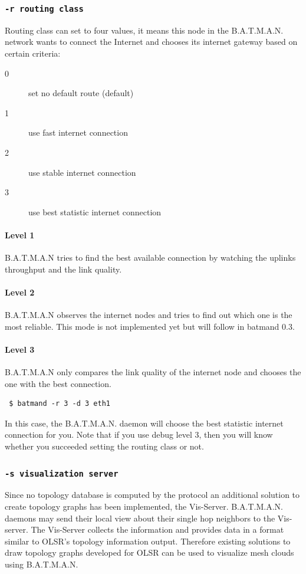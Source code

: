 \documentclass[
	12pt,
	a4paper,
	twoside,
	english,
	headsepline,
	footnosepline,
	automark,
	normalheadings,
	openany,
	cleardoubleplain,
	abstracton,
	idxtotoc,
	liststotoc,
	bibtotoc,
 	BCOR8mm,
]{scrartcl}
\newcommand{\subsubsectionttt}[1]{\subsubsection{\texttt{#1}}}
\begin{document}
\subsubsectionttt{-r routing class}
Routing class can set to four values, it means this node in the B.A.T.M.A.N.
network wants to connect the Internet and chooses its internet gateway based on
certain criteria:
\begin{description}
\item[0] set no default route (default)
\item[1] use fast internet connection
\item[2] use stable internet connection
\item[3] use best statistic internet connection
\end{description}

\paragraph*{Level 1}
B.A.T.M.A.N tries to find the best available connection by watching the uplinks
throughput and the link quality.

\paragraph*{Level 2}
B.A.T.M.A.N observes the internet nodes and tries to find out which one is the
most reliable. This mode is not implemented yet but will follow in batmand 0.3.

\paragraph*{Level 3}
B.A.T.M.A.N only compares the link quality of the internet node and chooses the
one with the best connection.

\begin{verbatim}
 $ batmand -r 3 -d 3 eth1
\end{verbatim}
In this case, the B.A.T.M.A.N. daemon will choose the best statistic internet
connection for you. Note that if you use debug level 3, then you will know
whether you succeeded setting the routing class or not.

\subsubsectionttt{-s visualization server}
Since no topology database is computed by the protocol an additional solution to
create topology graphs has been implemented, the Vis-Server. B.A.T.M.A.N.
daemons may send their local view about their single hop neighbors to the
Vis-server. The Vis-Server collects the information and provides data in a
format similar to OLSR's topology information output. Therefore existing
solutions to draw topology graphs developed for OLSR can be used to visualize
mesh clouds using B.A.T.M.A.N.
\end{document}
